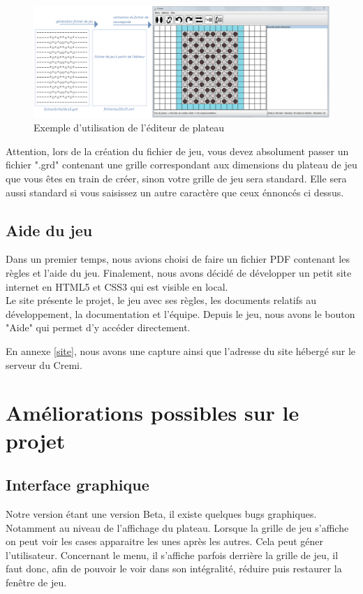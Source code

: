 \documentclass[a4paper,12pt]{report}
\begin{document}
\begin{figure}[H]
\centering
\includegraphics[scale=0.33]{Images/ExempleBP.png}
\caption{Exemple d'utilisation de l'éditeur de plateau}
\label{exbp}
\end{figure}

Attention, lors de la création du fichier de jeu, vous devez absolument passer un fichier ".grd" contenant une grille correspondant aux dimensions du plateau de jeu que vous êtes en train de créer, sinon votre grille de jeu sera standard. Elle sera aussi standard si vous saisissez un autre caractère que ceux énnoncés ci dessus.

\subsection{Aide du jeu}

Dans un premier temps, nous avions choisi de faire un fichier PDF contenant les règles et l’aide du jeu.
Finalement, nous avons décidé de développer un petit site internet en HTML5 et CSS3 qui est visible en local.  \\ 
Le site présente le projet, le jeu avec ses règles, les documents relatifs au développement, la documentation et l’équipe. 
Depuis le jeu, nous avons le bouton "Aide" qui permet d'y accéder directement.

En annexe \ref{site}, nous avons une capture ainsi que l'adresse du site hébergé sur le serveur du Cremi.

\section{Améliorations possibles sur le projet}

\subsection{Interface graphique}

Notre version étant une version Beta, il existe quelques bugs graphiques. Notamment au niveau de l'affichage du plateau. Lorsque la grille de jeu s'affiche on peut voir les cases apparaitre les unes après les autres. Cela peut géner l'utilisateur. Concernant le menu, il s'affiche parfois derrière la grille de jeu, il faut donc,  afin de pouvoir le voir dans son intégralité, réduire puis restaurer la fenêtre de jeu.
\end{document}
